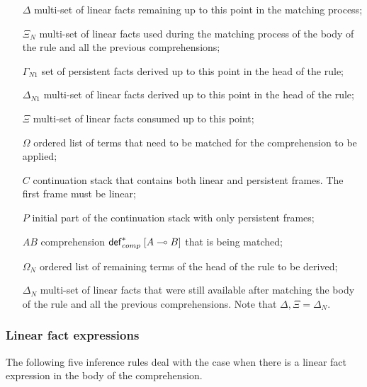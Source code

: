 \begin{enumerate}

   \item[$\Delta$] multi-set of linear facts remaining up to this point in the
   matching process;

   \item[$\Xi_N$] multi-set of linear facts used during the matching process of
   the body of the rule and all the previous comprehensions;

   \item[$\Gamma_{N1}$] set of persistent facts derived up to this point in the
   head of the rule;

   \item[$\Delta_{N1}$] multi-set of linear facts derived up to this point in
   the head of the rule;

   \item[$\Xi$] multi-set of linear facts consumed up to this point;

   \item[$\Omega$] ordered list of terms that need to be matched for the
   comprehension to be applied;

   \item[$C$] continuation stack that contains both linear and persistent
   frames. The first frame must be linear;

   \item[$P$] initial part of the continuation stack with only persistent
   frames;

   \item[$AB$] comprehension $\mathsf{def}_{comp}^{*} \; [A \multimap B]$ that is being matched;

   \item[$\Omega_N$] ordered list of remaining terms of the head of the rule to
   be derived;

   \item[$\Delta_N$] multi-set of linear facts that were still available after
   matching the body of the rule and all the previous comprehensions. Note that
   $\Delta, \Xi = \Delta_N$.

\end{enumerate}

\subsubsection{Linear fact expressions}

The following five inference rules deal with the case when there is a linear
fact expression in the body of the comprehension.

